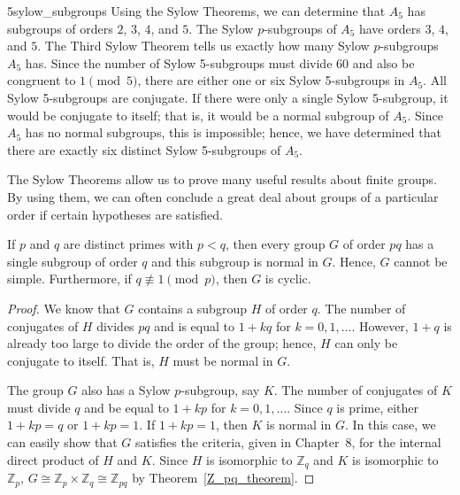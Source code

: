  
\begin{example}{5sylow_subgroups}
Using the Sylow Theorems, we can determine that $A_5$ has subgroups of
orders $2$, $3$, $4$, and $5$. The Sylow $p$-subgroups of $A_5$ have
orders $3$, $4$, and $5$. The Third Sylow Theorem tells us exactly how
many Sylow $p$-subgroups $A_5$ has. Since the number of Sylow 
5-subgroups must divide 60 and also be congruent to $1 \pmod{5}$,
there are either one or six Sylow 5-subgroups in $A_5$. All Sylow
5-subgroups are conjugate.  If there were only a single Sylow 
5-subgroup, it would be conjugate to itself; that is, it would be a
normal subgroup of $A_5$. Since $A_5$ has no normal subgroups, this is 
impossible; hence, we have determined that there are exactly six
distinct Sylow 5-subgroups of $A_5$. 
\end{example}
 
 
The Sylow Theorems allow us to prove many useful results about finite
groups. By using them, we can often conclude a great deal about groups 
of a particular order if certain hypotheses are satisfied.
 
 
\begin{theorem}\label{sylow:pq_cyclic_theorem}
If $p$ and $q$ are distinct primes with $p <q $, then every group $G$ of
order $pq$ has a single subgroup of order $q$ and this subgroup is
normal in $G$.  Hence, $G$ cannot be simple.  Furthermore, if $q
\not\equiv 1 \pmod{p}$, then $G$ is cyclic.
\end{theorem}
 
 
\begin{proof}
We know that $G$ contains a subgroup $H$ of order $q$. The number of
conjugates of $H$  divides $pq$ and is equal to $1 +kq$ for $k = 0, 1,
\ldots$. However, $1+q$ is already too large to divide the order of
the group; hence, $H$ can only be conjugate to itself.  That is, $H$
must be normal in $G$. 
 
 
The group $G$ also has a Sylow $p$-subgroup, say $K$. The number of
conjugates of $K$ must divide $q$ and be equal to $1 + kp$ for $k = 0,
1, \ldots$. Since $q$ is prime, either $1 +kp=q$ or $1+kp =1$. If $1
+kp=1$, then $K$ is normal in $G$. In this case, we can easily show
that $G$ satisfies the criteria, given in Chapter~8, for the
internal direct product of $H$ and $K$.  Since $H$ is isomorphic to
${\mathbb Z}_q$ and $K$ is isomorphic to ${\mathbb Z}_p$, $G \cong {\mathbb
Z}_p \times {\mathbb Z}_q  \cong {\mathbb Z}_{pq}$ by Theorem~\ref{Z_pq_theorem}. 
\mbox{\hspace*{1in}}
\end{proof}
 
